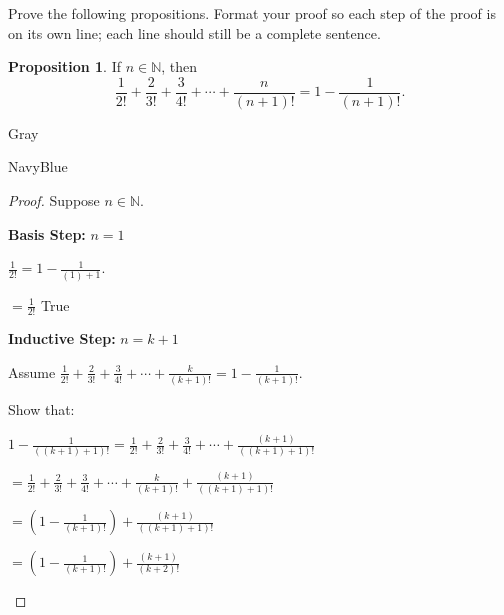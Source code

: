 \documentclass[12pt]{amsart}
\theoremstyle{named}
\newenvironment{prf}
{\medskip\begin{color}{Gray}\begin{framed}\begin{color}{NavyBlue}\begin{proof}[Proof]
\doublespacing}
{\end{proof}\end{color}\end{framed}\end{color}\medskip}
\theoremstyle{definition}
\newtheorem{proposition}{Proposition}
\newcommand{\N}{\mathbb N}
\begin{document}
Prove the following propositions. Format your proof so each step of the proof is on its own line; each line should still be a complete sentence.\\

\begin{proposition}
	If $n\in\N$, then
	$$\frac{1}{2!}+\frac{2}{3!}+\frac{3}{4!}+\cdots+\frac{n}{(n+1)!} = 1 - \frac{1}{(n+1)!}.$$
	
\end{proposition}

\begin{prf}
	\phantom{ }

	Suppose $n \in \mathbb N$.

	\textbf{Basis Step:} $n = 1$
	\begin{adjustwidth}{2em}{0em}
		$\displaystyle\frac{1}{2!} = 1 - \frac{1}{(1)+1}$.

		\hspace*{1.3em}$\displaystyle = \frac{1}{2!}$ \hspace*{1em}\checkmark True
	\end{adjustwidth}

	\vspace*{0.5em}

	\textbf{Inductive Step:} $n = k + 1$
	\begin{adjustwidth}{2em}{0em}
		Assume $\displaystyle \frac{1}{2!}+\frac{2}{3!}+\frac{3}{4!}+\cdots+\frac{k}{(k+1)!} = 1 - \frac{1}{(k+1)!}$.
		
		Show that: 

		$\displaystyle 1 - \frac{1}{((k+1)+1)!} = \frac{1}{2!}+\frac{2}{3!}+\frac{3}{4!}+\cdots+\frac{(k+1)}{((k+1)+1)!}$

		\vspace*{0.5em}

		\hspace*{8.105em}$\displaystyle = \frac{1}{2!}+\frac{2}{3!}+\frac{3}{4!}+\cdots+\frac{k}{(k+1)!} +\frac{(k+1)}{((k+1)+1)!}$
		
		\vspace*{0.5em}
		
		\hspace*{8.105em}$\displaystyle = (1 - \frac{1}{(k+1)!}) +\frac{(k+1)}{((k+1)+1)!}$

		\vspace*{0.5em}

		\hspace*{8.105em}$\displaystyle = (1 - \frac{1}{(k+1)!}) +\frac{(k+1)}{(k+2)!}$


\end{adjustwidth}
\end{prf}
\end{document}
